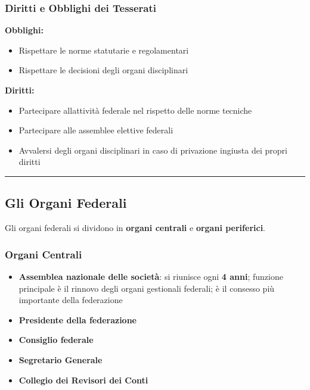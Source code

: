 \documentclass[a4paper,11pt]{article}
\providecommand{\tightlist}{%
  \setlength{\itemsep}{0pt}\setlength{\parskip}{0pt}}
\begin{document}
\subsubsection{Diritti e Obblighi dei
      Tesserati}\label{diritti-e-obblighi-dei-tesserati}

\textbf{Obblighi:}

\begin{itemize}
      \tightlist
      \item
            Rispettare le norme statutarie e regolamentari
      \item
            Rispettare le decisioni degli organi disciplinari
\end{itemize}

\textbf{Diritti:}

\begin{itemize}
      \tightlist
      \item
            Partecipare all\textquotesingle attività federale nel rispetto delle
            norme tecniche
      \item
            Partecipare alle assemblee elettive federali
      \item
            Avvalersi degli organi disciplinari in caso di privazione ingiusta dei
            propri diritti
\end{itemize}

\begin{center}\rule{0.5\linewidth}{0.5pt}\end{center}

\subsection{Gli Organi Federali}\label{gli-organi-federali}

Gli organi federali si dividono in \textbf{organi centrali} e
\textbf{organi periferici}.

\subsubsection{Organi Centrali}\label{organi-centrali}

\begin{itemize}
      \tightlist
      \item
            \textbf{Assemblea nazionale delle società}: si riunisce ogni \textbf{4
                  anni}; funzione principale è il rinnovo degli organi gestionali
            federali; è il consesso più importante della federazione
      \item
            \textbf{Presidente della federazione}
      \item
            \textbf{Consiglio federale}
      \item
            \textbf{Segretario Generale}
      \item
            \textbf{Collegio dei Revisori dei Conti}
\end{itemize}
\end{document}
